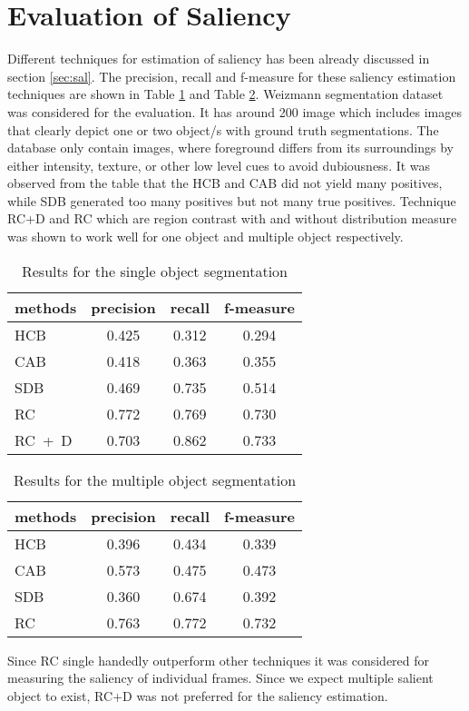 \section{Evaluation of Saliency}
\label{sec:EvS}
Different techniques for estimation of saliency has been already discussed in section \ref{sec:sal}. The precision, recall and f-measure for these saliency estimation techniques are shown in Table \ref{tab:salOneObj} and Table \ref{tab:salTwoObj}. Weizmann segmentation dataset was considered for the evaluation. It has around 200 image which includes images that clearly depict one or two object/s with ground truth segmentations. The database only contain images, where foreground differs from its surroundings by either intensity, texture, or other low level cues to avoid dubiousness.
It was observed from the table that the HCB and CAB did not yield many positives, while SDB generated too many positives but not many true positives. Technique RC+D and RC which are region contrast with and without distribution measure was shown to work well for one object and multiple object respectively.
\begin{table}[htbp]
   \caption{Results for the single object segmentation}
   \begin{center}
   \begin{tabular}{|l|c|c|c|} \hline
     methods & precision & recall & f-measure \\ \hline
     HCB & 0.425 & 0.312 & 0.294 \\
	 CAB & 0.418 & 0.363 & 0.355 \\
 	 SDB & 0.469 & 0.735 & 0.514 \\
	 RC  & 0.772 & 0.769 & 0.730 \\
	 RC~+~D & 0.703	& 0.862 & 0.733	\\ \hline
   \end{tabular}
   \label{tab:salOneObj}
   \medskip \small 
   \end{center}
 \end{table}
\begin{table}[htbp]
   \caption{Results for the multiple object segmentation}
   \begin{center}
   \begin{tabular}{|l|c|c|c|} \hline
     \textbf{methods} & \textbf{precision} & \textbf{recall} & \textbf{f-measure} \\ \hline
     HCB & 0.396 & 0.434 & 0.339 \\
	 CAB & 0.573 & 0.475 & 0.473 \\
 	 SDB & 0.360 & 0.674 & 0.392 \\
	 RC  & 0.763 & 0.772 & 0.732 \\ \hline
   \end{tabular}
   \label{tab:salTwoObj}
   \end{center}
 \end{table} 
\par Since RC single handedly outperform other techniques it was considered for measuring the saliency of individual frames. Since we expect multiple salient object to exist, RC+D was not preferred for the saliency estimation.
 

